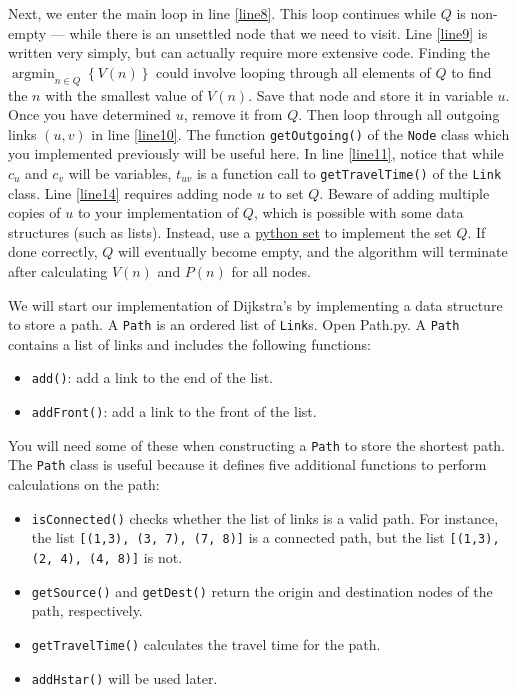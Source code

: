 \documentclass[11pt]{article}
\DeclareMathOperator*{\argmin}{\arg\min}
\begin{document}
Next, we enter the main loop in line \ref{line8}. This loop continues while $Q$ is non-empty --- while there is an unsettled node that we need to visit. Line \ref{line9} is written very simply, but can actually require more extensive code. Finding the $\argmin_{n\in Q} \left\{V(n)\right\}$ could involve looping through all elements of $Q$ to find the $n$ with the smallest value of $V(n)$. Save that node and store it in variable $u$. Once you have determined $u$, remove it from $Q$. Then loop through all outgoing links $(u,v)$ in line \ref{line10}. The function \texttt{getOutgoing()} of the \texttt{Node} class which you implemented previously will be useful here. In line \ref{line11}, notice that while $c_u$ and $c_v$ will be variables, $t_{uv}$ is a function call to \texttt{getTravelTime()} of the \texttt{Link} class. Line \ref{line14} requires adding node $u$ to set $Q$. Beware of adding multiple copies of $u$ to your implementation of $Q$, which is possible with some data structures (such as lists). Instead, use a \href{https://www.w3schools.com/python/python_sets.asp}{python set} to implement the set $Q$. If done correctly, $Q$ will eventually become empty, and the algorithm will terminate after calculating $V(n)$ and $P(n)$ for all nodes. 






We will start our implementation of Dijkstra's by implementing a data structure to store a path. 
A \texttt{Path} is an ordered list of \texttt{Link}s. Open Path.py. A \texttt{Path} contains a list of links and includes the following functions:
\begin{itemize}
	\item \texttt{add()}: add a link to the end of the list.
	\item \texttt{addFront()}: add a link to the front of the list.
\end{itemize}
You will need some of these when constructing a \texttt{Path} to store the shortest path. The \texttt{Path} class is useful because it 
 defines five additional functions to perform calculations on the path:
\begin{itemize}
	\item \texttt{isConnected()} checks whether the list of links is a valid path. For instance, the list \texttt{[(1,3), (3, 7), (7, 8)]} is a connected path, but the list \texttt{[(1,3), (2, 4), (4, 8)]} is not.
	\item  \texttt{getSource()} and \texttt{getDest()} return the origin and destination nodes of the path, respectively.
	\item \texttt{getTravelTime()} calculates the travel time for the path.
	\item \texttt{addHstar()} will be used later.
\end{itemize}
\end{document}
